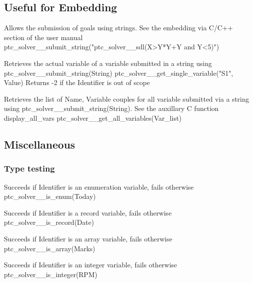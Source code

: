 \documentclass{article}
\begin{document}
\subsection{Useful for Embedding}

\hspace{\parindent}
        {Allows the submission of goals using strings. See the embedding via
C/C++ section of the user manual}
        {ptc\_solver\_\_submit\_string("ptc\_solver\_\_sdl(X>Y*Y+Y and Y<5)")}
        {}

        {Retrieves the actual variable of a variable submitted in a string using
ptc\_solver\_\_submit\_string(String)}
        {ptc\_solver\_\_get\_single\_variable("S1", Value)}
        {Returns -2 if the Identifier is out of scope}

        {Retrieves the list of Name, Variable couples for all variable submitted
via a string using  ptc\_solver\_\_submit\_string(String).
         See the auxillary C function display\_all\_vars}
        {ptc\_solver\_\_get\_all\_variables(Var\_list)}
        {}

\subsection{Miscellaneous}

\subsubsection{Type testing}

\hspace{\parindent}
    {Succeeds if Identifier is an enumeration variable, fails otherwise}
    {ptc\_solver\_\_is\_enum(Today)}
    {}

    {Succeeds if Identifier is a record variable, fails otherwise}
    {ptc\_solver\_\_is\_record(Date)}
    {}

    {Succeeds if Identifier is an array variable, fails otherwise}
    {ptc\_solver\_\_is\_array(Marks)}
    {}

    {Succeeds if Identifier is an integer variable, fails otherwise}
    {ptc\_solver\_\_is\_integer(RPM)}
    {}
\end{document}
